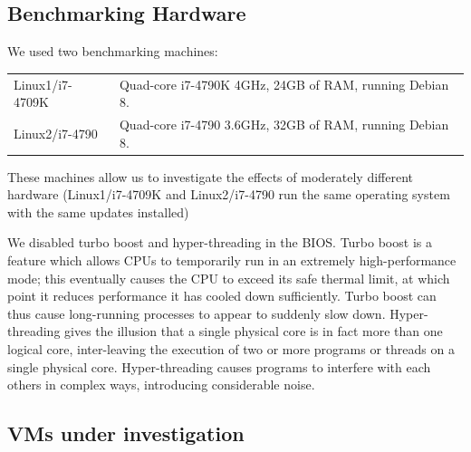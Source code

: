 \documentclass[a4paper,UKenglish]{lipics}
\newcommand{\hyptwo}{H2\xspace}
\newcommand{\bencherthree}{Linux1/i7-4709K\xspace}
\newcommand{\bencherfive}{Linux2/i7-4790\xspace}
\newcommand{\benchersix}{OpenBSD/i7-4790\xspace}
\begin{document}
\subsection{Benchmarking Hardware}

We used two benchmarking machines:

\begin{tabular}{ll}
  \bencherthree & Quad-core i7-4790K 4GHz, 24GB of RAM, running Debian 8. \\
  \bencherfive  & Quad-core i7-4790 3.6GHz, 32GB of RAM, running Debian 8.
\end{tabular}

\noindent These machines allow us to investigate the effects of moderately different
hardware (\bencherthree and \bencherfive run the same operating system with the
same updates installed)

We disabled turbo boost and hyper-threading in the BIOS. Turbo boost is a
feature which allows CPUs to temporarily run in an extremely high-performance
mode; this eventually causes the CPU to exceed its safe thermal limit,
at which point it reduces performance it has cooled down sufficiently.
Turbo boost can thus cause long-running processes to
appear to suddenly slow down. Hyper-threading gives the illusion that a single
physical core is in fact more than one logical core, inter-leaving the
execution of two or more programs or threads on a single physical core.
Hyper-threading causes programs to interfere
with each others in complex ways, introducing considerable noise.


\subsection{VMs under investigation}
\end{document}
